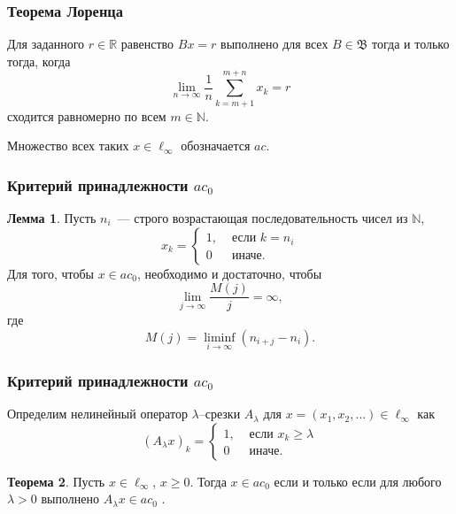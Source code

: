 \documentclass[10pt,pdf,hyperref={unicode},aspectratio=169]{beamer}
\theoremstyle{definition}
\newtheorem{llemma}{Лемма}
\newtheorem{ttheorem}[llemma]{Теорема}
\begin{document}
\begin{frame}\frametitle{Теорема Лоренца}
	Для заданного $r\in\mathbb{R}$ равенство $Bx=r$ выполнено для всех $B\in\mathfrak{B}$
	тогда и только тогда, когда
	\begin{equation*}
		\lim_{n\to\infty} \frac{1}{n} \sum_{k=m+1}^{m+n} x_k = r
	\end{equation*}
	сходится равномерно по всем $m\in\mathbb{N}$.

	Множество всех таких $x \in \ell_\infty$ обозначается $ac$.
\end{frame}



\begin{frame}
	\frametitle{Критерий принадлежности $ac_0$~\cite{our-mz2019ac0}}


	\begin{llemma}
		Пусть $n_i$~--- строго возрастающая последовательность чисел из $\mathbb{N}$,
		\begin{equation*}
			x_k = \left\{\begin{array}{ll}
				1, & \mbox{~если~} k = n_i
				\\
				0  & \mbox{~иначе.~}
			\end{array}\right.
		\end{equation*}
		Для того, чтобы $x\in ac_0$,
		необходимо и достаточно, чтобы
		\begin{equation}\label{lim_M(j)/j}
			\lim_{j \to \infty} \frac{M(j)}{j} = \infty
			,
		\end{equation}
		где
		\begin{equation*}
			M(j) = \liminf_{i\to\infty} (n_{i+j} - n_i)
			.
		\end{equation*}
	\end{llemma}


\end{frame}



\begin{frame}
	\frametitle{Критерий принадлежности $ac_0$~\cite{our-mz2019ac0}}


	Определим нелинейный оператор $\lambda$--срезки $A_\lambda$
	для $x = (x_1, x_2, ...)\in\ell_\infty$ как
	\begin{equation*}
		(A_\lambda x)_k = \begin{cases}
			1, & \mbox{~если~} x_k \geq \lambda
			\\
			0  & \mbox{~иначе.~}
		\end{cases}
	\end{equation*}

	\begin{ttheorem}
		\label{thm:lambda_prelim}
		Пусть $x\in\ell_\infty$, $x\geq 0$.
		Тогда
		$
			x\in ac_0
		$
		если и только если
		для любого $\lambda > 0$
		выполнено
		$
			A_\lambda x \in ac_0
		$
		.
	\end{ttheorem}

\end{frame}
\end{document}
